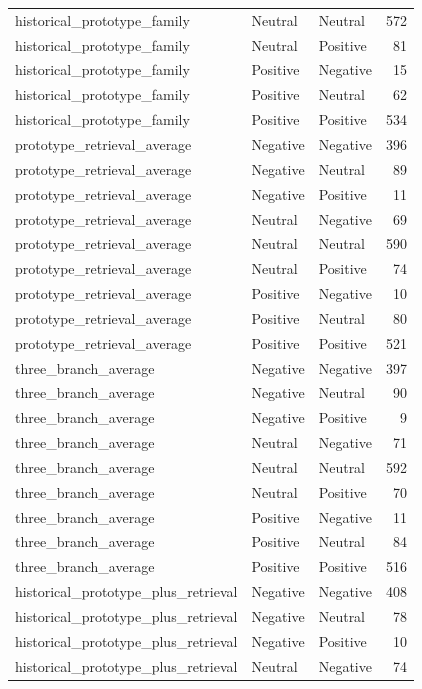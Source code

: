 \begin{tabular}{lllr}
historical_prototype_family & Neutral & Neutral & 572 \\
historical_prototype_family & Neutral & Positive & 81 \\
historical_prototype_family & Positive & Negative & 15 \\
historical_prototype_family & Positive & Neutral & 62 \\
historical_prototype_family & Positive & Positive & 534 \\
prototype_retrieval_average & Negative & Negative & 396 \\
prototype_retrieval_average & Negative & Neutral & 89 \\
prototype_retrieval_average & Negative & Positive & 11 \\
prototype_retrieval_average & Neutral & Negative & 69 \\
prototype_retrieval_average & Neutral & Neutral & 590 \\
prototype_retrieval_average & Neutral & Positive & 74 \\
prototype_retrieval_average & Positive & Negative & 10 \\
prototype_retrieval_average & Positive & Neutral & 80 \\
prototype_retrieval_average & Positive & Positive & 521 \\
three_branch_average & Negative & Negative & 397 \\
three_branch_average & Negative & Neutral & 90 \\
three_branch_average & Negative & Positive & 9 \\
three_branch_average & Neutral & Negative & 71 \\
three_branch_average & Neutral & Neutral & 592 \\
three_branch_average & Neutral & Positive & 70 \\
three_branch_average & Positive & Negative & 11 \\
three_branch_average & Positive & Neutral & 84 \\
three_branch_average & Positive & Positive & 516 \\
historical_prototype_plus_retrieval & Negative & Negative & 408 \\
historical_prototype_plus_retrieval & Negative & Neutral & 78 \\
historical_prototype_plus_retrieval & Negative & Positive & 10 \\
historical_prototype_plus_retrieval & Neutral & Negative & 74 \\

\end{tabular}
